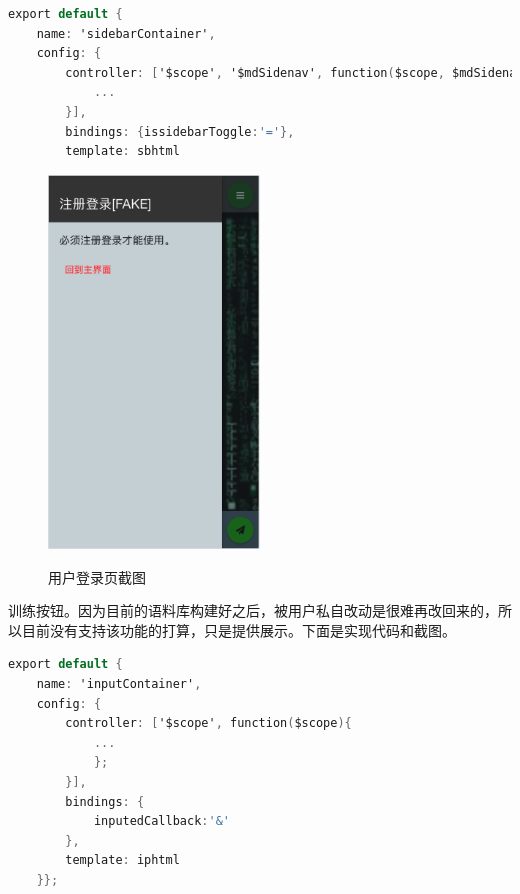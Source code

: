 \documentclass[bachelor,winfonts]{jnuthesis}
\begin{document}
\begin{lstlisting}[language=C]
export default {
	name: 'sidebarContainer', 
	config: {
		controller: ['$scope', '$mdSidenav', function($scope, $mdSidenav){
            ...
		}],
		bindings: {issidebarToggle:'='},
		template: sbhtml
\end{lstlisting}


\begin{figure}[H]
  \centering
  \includegraphics[width= 0.5\textwidth]{chat2.png}\\
  \caption{用户登录页截图}\label{fig:pic8}
\end{figure}


训练按钮。因为目前的语料库构建好之后，被用户私自改动是很难再改回来的，所以目前没有支持该功能的打算，只是提供展示。下面是实现代码和截图。

\begin{lstlisting}[language=C]
export default {
	name: 'inputContainer', 
	config: {
		controller: ['$scope', function($scope){
			...
			};
		}],
		bindings: {
			inputedCallback:'&'
		},
		template: iphtml
	}};
\end{lstlisting}
\end{document}
